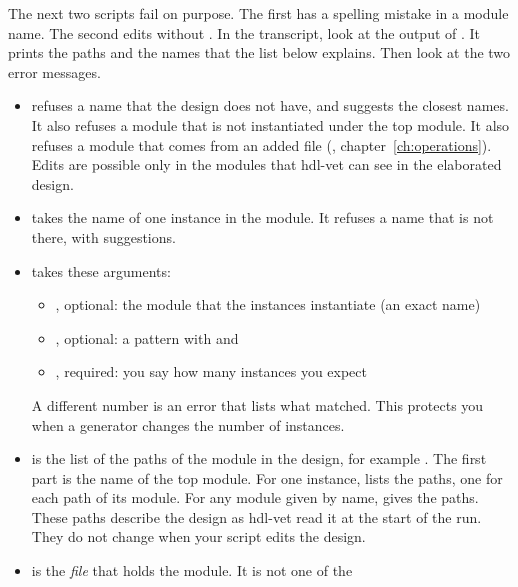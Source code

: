 

The next two scripts fail on purpose. The first has a spelling mistake in a module
name. The second edits  without . In the transcript, look at
the output of . It prints the paths and the names that the list below
explains. Then look at the two error messages.






\begin{itemize}
\item {} refuses a name that the design does not have, and suggests
  the closest names. It also refuses a module that is not instantiated under the
  top module. It also refuses a module that comes from an added file
  (, chapter~\ref{ch:operations}). Edits are possible only in
  the modules that hdl-vet can see in the elaborated design.
\item {} takes the name of one instance in the module. It
  refuses a name that is not there, with suggestions.
\item {} takes these arguments:
  \begin{itemize}
  \item {}, optional: the module that the instances instantiate (an exact name)
  \item {}, optional: a pattern with \code{*} and 
  \item {}, required: you say how many instances you expect
  \end{itemize}
  A different number is an error that lists what matched. This protects you when a
  generator changes the number of instances.
\item {} is the list of the paths of the module in the
  design, for example . The first part is the
  name of the top module. For one instance,  lists the paths, one
  for each path of its module. For any module given by name, 
  gives the paths. These paths describe the design as hdl-vet read it at the start
  of the run. They do not change when your script edits the design.
\item {} is the \emph{file} that holds the module. It is not one of the

\end{itemize}
